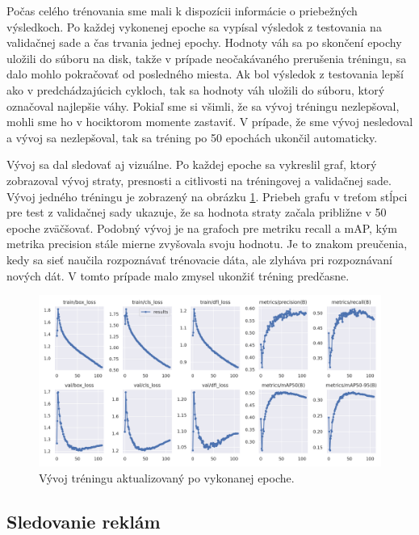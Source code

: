 Počas celého trénovania sme mali k dispozícii informácie o priebežných výsledkoch. Po každej vykonenej epoche sa vypísal výsledok z testovania na validačnej sade a čas trvania jednej epochy. Hodnoty váh sa po skončení epochy uložili do súboru na disk, takže v prípade neočakávaného prerušenia tréningu, sa dalo mohlo pokračovať od posledného miesta. Ak bol výsledok z testovania lepší ako v predchádzajúcich cykloch, tak sa hodnoty váh uložili do súboru, ktorý označoval najlepšie váhy. Pokiaľ sme si všimli, že sa vývoj tréningu nezlepšoval, mohli sme ho v hociktorom momente zastaviť. V prípade, že sme vývoj nesledoval a vývoj sa nezlepšoval, tak sa tréning po 50 epochách ukončil automaticky.

Vývoj sa dal sledovať aj vizuálne. Po každej epoche sa vykreslil graf, ktorý zobrazoval vývoj straty, presnosti a citlivosti na tréningovej a validačnej sade. Vývoj jedného tréningu je zobrazený na obrázku \ref{img:graf}. Priebeh grafu v treťom stĺpci pre test z validačnej sady ukazuje, že sa hodnota straty začala približne v 50 epoche zväčšovať. Podobný vývoj je na grafoch pre metriku recall a mAP, kým metrika precision stále mierne zvyšovala svoju hodnotu. Je to znakom preučenia, kedy sa sieť naučila rozpoznávať trénovacie dáta, ale zlyháva pri rozpoznávaní nových dát. V tomto prípade malo zmysel ukonžiť tréning predčasne.
\\
\begin{figure}[ht]
    \centering
    \includegraphics[width=1\textwidth]{images/04/graf.png}
    \caption{Vývoj tréningu aktualizovaný po vykonanej epoche.}
    \label{img:graf}
\end{figure}

\subsection{Sledovanie reklám}

